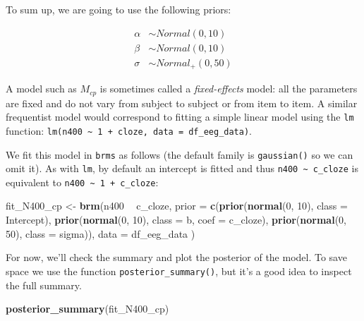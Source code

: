 \documentclass[12pt,]{krantz}
\newenvironment{Shaded}{\begin{snugshade}}{\end{snugshade}}
\newcommand{\DataTypeTok}[1]{\textcolor[rgb]{0.13,0.29,0.53}{#1}}
\newcommand{\DecValTok}[1]{\textcolor[rgb]{0.00,0.00,0.81}{#1}}
\newcommand{\KeywordTok}[1]{\textcolor[rgb]{0.13,0.29,0.53}{\textbf{#1}}}
\newcommand{\NormalTok}[1]{#1}
\newcommand{\OperatorTok}[1]{\textcolor[rgb]{0.81,0.36,0.00}{\textbf{#1}}}
\newcommand{\StringTok}[1]{\textcolor[rgb]{0.31,0.60,0.02}{#1}}
\theoremstyle{definition}
\theoremstyle{definition}
\theoremstyle{definition}
\theoremstyle{remark}
\begin{document}
To sum up, we are going to use the following priors:

\begin{equation}
 \begin{aligned}
 \alpha &\sim Normal(0,10)\\
 \beta  &\sim Normal(0,10)\\
 \sigma  &\sim Normal_{+}(0,50)
 \end{aligned}
 \end{equation}

A model such as \(M_{cp}\) is sometimes called a \emph{fixed-effects} model: all the parameters are fixed and do not vary from subject to subject or from item to item. A similar frequentist model would correspond to fitting a simple linear model using the \texttt{lm} function: \texttt{lm(n400\ \textasciitilde{}\ 1\ +\ cloze,\ data\ =\ df\_eeg\_data)}.

We fit this model in \texttt{brms} as follows (the default family is \texttt{gaussian()} so we can omit it). As with \texttt{lm}, by default an intercept is fitted and thus \texttt{n400\ \textasciitilde{}\ c\_cloze} is equivalent to \texttt{n400\ \textasciitilde{}\ 1\ +\ c\_cloze}:

\begin{Shaded}
\begin{Highlighting}[]
\NormalTok{fit_N400_cp <-}\StringTok{ }\KeywordTok{brm}\NormalTok{(n400 }\OperatorTok{~}\StringTok{ }\NormalTok{c_cloze,}
  \DataTypeTok{prior =} 
    \KeywordTok{c}\NormalTok{(}\KeywordTok{prior}\NormalTok{(}\KeywordTok{normal}\NormalTok{(}\DecValTok{0}\NormalTok{, }\DecValTok{10}\NormalTok{), }\DataTypeTok{class =}\NormalTok{ Intercept),}
      \KeywordTok{prior}\NormalTok{(}\KeywordTok{normal}\NormalTok{(}\DecValTok{0}\NormalTok{, }\DecValTok{10}\NormalTok{), }\DataTypeTok{class =}\NormalTok{ b, }\DataTypeTok{coef =}\NormalTok{ c_cloze),}
      \KeywordTok{prior}\NormalTok{(}\KeywordTok{normal}\NormalTok{(}\DecValTok{0}\NormalTok{, }\DecValTok{50}\NormalTok{), }\DataTypeTok{class =}\NormalTok{ sigma)),}
  \DataTypeTok{data =}\NormalTok{ df_eeg_data}
\NormalTok{)}
\end{Highlighting}
\end{Shaded}

For now, we'll check the summary and plot the posterior of the model. To save space we use the function \texttt{posterior\_summary()}, but it's a good idea to inspect the full summary.

\begin{Shaded}
\begin{Highlighting}[]
\KeywordTok{posterior_summary}\NormalTok{(fit_N400_cp)}
\end{Highlighting}
\end{Shaded}
\end{document}
